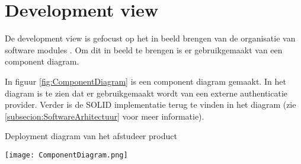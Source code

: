 \section{Development view}
De development view is gefocust op het in beeld brengen van de organisatie van software modules \parencite{4p1Model}.
Om dit in beeld te brengen is er gebruikgemaakt van een component diagram.

\whitespace
In figuur \ref{fig:ComponentDiagram} is een component diagram gemaakt.
In het diagram is te zien dat er gebruikgemaakt wordt van een externe authenticatie provider.
Verder is de SOLID implementatie terug te vinden in het diagram (zie \ref{subsecion:SoftwareArhitectuur} voor meer informatie). 

\whitespace[2]
\begin{graphic}
    \captionsetup{type=figure}
    \caption{Deployment diagram van het afstudeer product}
    \texttt{[image: ComponentDiagram.png]}
    \label{fig:ComponentDiagram}
\end{graphic}
